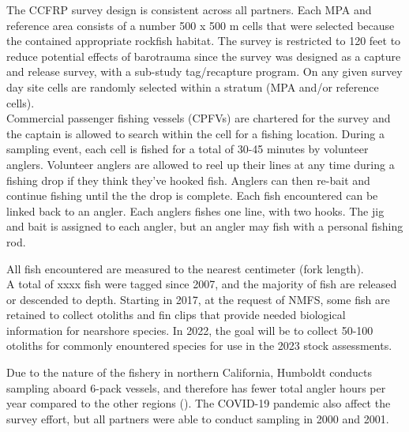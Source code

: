 \documentclass[
]{article}
\begin{document}
The CCFRP survey design is consistent across all partners. Each MPA and reference
area consists of a number 500 x 500 m cells that were selected because the contained
appropriate rockfish habitat. The survey is restricted to 120 feet to reduce
potential effects of barotrauma since the survey was designed as a capture
and release survey, with a sub-study tag/recapture program. On any given survey
day site cells are randomly selected within a stratum (MPA and/or reference cells).\\
Commercial passenger fishing vessels (CPFVs) are chartered for the survey and
the captain is allowed to search within the cell for a fishing location. During
a sampling event, each cell is fished for a total of 30-45 minutes by volunteer
anglers. Volunteer anglers are allowed to reel up their lines at any time during a
fishing drop if they think they've hooked fish. Anglers can then re-bait and
continue fishing until the the drop is complete. Each fish encountered
can be linked back to an angler. Each anglers fishes one line, with two hooks.
The jig and bait is assigned to each angler, but an angler may fish with a personal
fishing rod.

All fish encountered are measured to the nearest centimeter (fork length).\\
A total of xxxx fish were tagged since 2007, and the majority of fish are
released or descended to depth. Starting in 2017, at the request of NMFS, some
fish are retained to collect otoliths and fin clips that provide needed
biological information for nearshore species. In 2022, the goal will be to collect
50-100 otoliths for commonly enountered species for use in the 2023 stock assessments.

Due to the nature of the fishery in northern California, Humboldt conducts sampling aboard 6-pack
vessels, and therefore has fewer total angler hours per year compared to the
other regions (). The COVID-19 pandemic also affect the survey effort, but all
partners were able to conduct sampling in 2000 and 2001.
\end{document}
